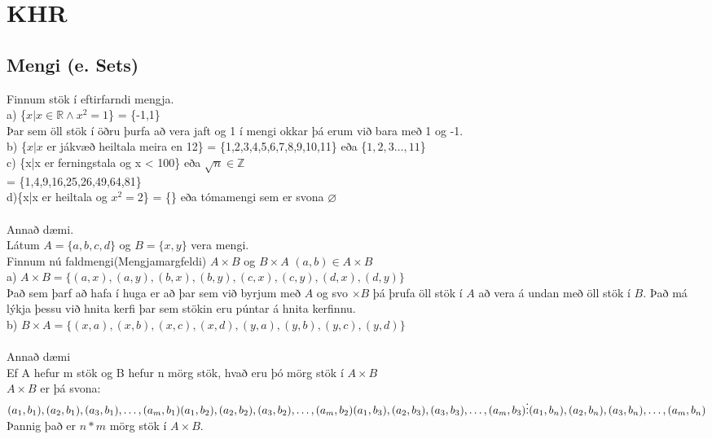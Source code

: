 \section{KHR}
\subsection{Mengi (e. Sets)}
Finnum stök í eftirfarndi mengja.\\
a) \{$x | x \in \mathbb{R} \wedge x^2=1 $\} = \{-1,1\}\\
Þar sem öll stök í öðru þurfa að vera jaft og 1 í mengi okkar þá erum við bara með 1 og -1.\\
b) \{$x|x$ er jákvæð heiltala meira en 12\} = \{1,2,3,4,5,6,7,8,9,10,11\} eða \{$1,2,3\ldots ,11$\}\\
c) \{x|x er ferningstala og x < 100\} eða $\sqrt{n}\in \mathbb{Z}$\\
= \{1,4,9,16,25,26,49,64,81\}\\
d)\{x|x er heiltala og $x^2 = 2$\} = \{\} eða tómamengi sem er svona $\varnothing$\\
\\
Annað dæmi.\\
Látum $A=\{a,b,c,d\}$ og $B=\{x,y\}$ vera mengi.\\
Finnum nú faldmengi(Mengjamargfeldi) $A \times B$ og $B \times A$ $(a,b) \in A \times B$\\
a) $A \times B = \{(a,x), (a,y), (b,x), (b,y), (c,x), (c,y), (d,x), (d,y)\}$\\
\indent Það sem þarf að hafa í huga er að þar sem við byrjum með $A$ og svo $\times B$ þá \indent þrufa öll stök í $A$ að vera á undan með öll stök í $B$. Það má lýkja þessu við \indent hnita kerfi þar sem stökin eru púntar á hnita kerfinnu.\\
b) $B \times A = \{(x,a), (x,b), (x,c), (x,d), (y,a), (y,b), (y,c), (y,d)\}$\\
\\
Annað dæmi\\
Ef A hefur m stök og B hefur n mörg stök, hvað eru þó mörg stök í $A \times B$\\
$A \times B$ er þá svona:\\
$(a_1,b_1),(a_2,b_1),(a_3,b_1), \ldots ,(a_m,b_1)
\\ 
(a_1,b_2),(a_2,b_2),(a_3,b_2), \ldots ,(a_m,b_2)
\\
(a_1,b_3),(a_2,b_3),(a_3,b_3), \ldots ,(a_m,b_3)
\\ \vdots \\
(a_1,b_n),(a_2,b_n),(a_3,b_n), \ldots ,(a_m,b_n)$\\
Þannig það er $n*m$ mörg stök í $A \times B$.\\
\newpage
